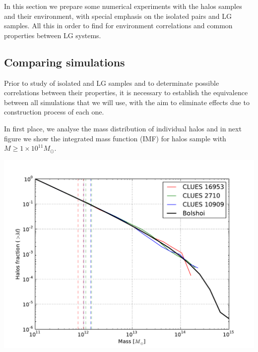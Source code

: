 \documentclass[usenatbib]{mn2e}
\begin{document}
In this section we prepare some numerical experiments with the halos 
samples and their environment, with special emphasis on the isolated pairs 
and LG samples. All this in order to find for environment correlations and 
common properties between LG systems.


\subsection{Comparing simulations}
\label{subsec:comparison_simulations}


Prior to study of isolated and LG samples and to determinate possible 
correlations between their properties, it is necessary to establish the 
equivalence between all simulations that we will use, with the aim to 
eliminate effects due to construction process of each one.


In first place, we analyse the mass distribution of individual halos and 
in next figure we show the integrated mass function (IMF) for halos sample
with $M \geq 1\times 10^{11} M_{\odot}$.


\begin{flushleft}
\begin{center}

\includegraphics[keepaspectratio=true,width=0.35\textheight]
{./figures/Halos_IMF.pdf}


\label{fig:IMF_Halos}
\vspace{0.1 cm}
\end{center}
\end{flushleft}
\end{document}
